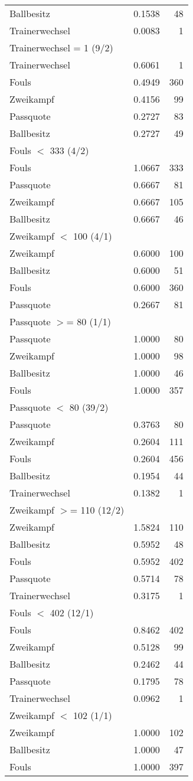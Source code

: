 \begin{table}[ht]
\begin{tabular}{lrr}
  Ballbesitz & 0.1538 & 48 \\ 
  Trainerwechsel & 0.0083 & 1 \\ 
  Trainerwechsel = 1 (9/2) &  &  \\ 
  Trainerwechsel & 0.6061 & 1 \\ 
  Fouls & 0.4949 & 360 \\ 
  Zweikampf & 0.4156 & 99 \\ 
  Passquote & 0.2727 & 83 \\ 
  Ballbesitz & 0.2727 & 49 \\ 
  Fouls $<$ 333 (4/2) &  &  \\ 
  Fouls & 1.0667 & 333 \\ 
  Passquote & 0.6667 & 81 \\ 
  Zweikampf & 0.6667 & 105 \\ 
  Ballbesitz & 0.6667 & 46 \\ 
  Zweikampf $<$ 100 (4/1) &  &  \\ 
  Zweikampf & 0.6000 & 100 \\ 
  Ballbesitz & 0.6000 & 51 \\ 
  Fouls & 0.6000 & 360 \\ 
  Passquote & 0.2667 & 81 \\ 
  Passquote $>$= 80 (1/1) &  &  \\ 
  Passquote & 1.0000 & 80 \\ 
  Zweikampf & 1.0000 & 98 \\ 
  Ballbesitz & 1.0000 & 46 \\ 
  Fouls & 1.0000 & 357 \\ 
  Passquote $<$ 80 (39/2) &  &  \\ 
  Passquote & 0.3763 & 80 \\ 
  Zweikampf & 0.2604 & 111 \\ 
  Fouls & 0.2604 & 456 \\ 
  Ballbesitz & 0.1954 & 44 \\ 
  Trainerwechsel & 0.1382 & 1 \\ 
  Zweikampf $>$= 110 (12/2) &  &  \\ 
  Zweikampf & 1.5824 & 110 \\ 
  Ballbesitz & 0.5952 & 48 \\ 
  Fouls & 0.5952 & 402 \\ 
  Passquote & 0.5714 & 78 \\ 
  Trainerwechsel & 0.3175 & 1 \\ 
  Fouls $<$ 402 (12/1) &  &  \\ 
  Fouls & 0.8462 & 402 \\ 
  Zweikampf & 0.5128 & 99 \\ 
  Ballbesitz & 0.2462 & 44 \\ 
  Passquote & 0.1795 & 78 \\ 
  Trainerwechsel & 0.0962 & 1 \\ 
  Zweikampf $<$ 102 (1/1) &  &  \\ 
  Zweikampf & 1.0000 & 102 \\ 
  Ballbesitz & 1.0000 & 47 \\ 
  Fouls & 1.0000 & 397 \\ 
   \hline
\end{tabular}
\label{tab:splits}
\end{table}
